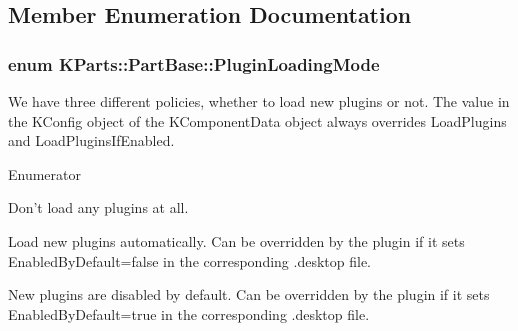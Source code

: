 \subsection{Member Enumeration Documentation}
\hypertarget{classKParts_1_1PartBase_a73b04eba759c3505ac722b2ceaaa8b76}{
\subsubsection[{Plugin\+Loading\+Mode}]{\setlength{\rightskip}{0pt plus 5cm}enum {\bf K\+Parts\+::\+Part\+Base\+::\+Plugin\+Loading\+Mode}\hspace{0.3cm}{\ttfamily [protected]}}}\label{classKParts_1_1PartBase_a73b04eba759c3505ac722b2ceaaa8b76}
We have three different policies, whether to load new plugins or not. The value in the K\+Config object of the K\+Component\+Data object always overrides Load\+Plugins and Load\+Plugins\+If\+Enabled. \begin{Desc}
\item[Enumerator]\par
\begin{description}
\item[{\em 
\hypertarget{classKParts_1_1PartBase_a73b04eba759c3505ac722b2ceaaa8b76a3ffe0a5005d5e1d00b4d3fd8c4d51a1e}{Do\+Not\+Load\+Plugins}\label{classKParts_1_1PartBase_a73b04eba759c3505ac722b2ceaaa8b76a3ffe0a5005d5e1d00b4d3fd8c4d51a1e}
}]Don't load any plugins at all. \item[{\em 
\hypertarget{classKParts_1_1PartBase_a73b04eba759c3505ac722b2ceaaa8b76aeff505f5627f1539e03730d042e39522}{Load\+Plugins}\label{classKParts_1_1PartBase_a73b04eba759c3505ac722b2ceaaa8b76aeff505f5627f1539e03730d042e39522}
}]Load new plugins automatically. Can be overridden by the plugin if it sets Enabled\+By\+Default=false in the corresponding .desktop file. \item[{\em 
\hypertarget{classKParts_1_1PartBase_a73b04eba759c3505ac722b2ceaaa8b76aeaf6ca999ef635e22e3f52234226e931}{Load\+Plugins\+If\+Enabled}\label{classKParts_1_1PartBase_a73b04eba759c3505ac722b2ceaaa8b76aeaf6ca999ef635e22e3f52234226e931}
}]New plugins are disabled by default. Can be overridden by the plugin if it sets Enabled\+By\+Default=true in the corresponding .desktop file. \end{description}
\end{Desc}


